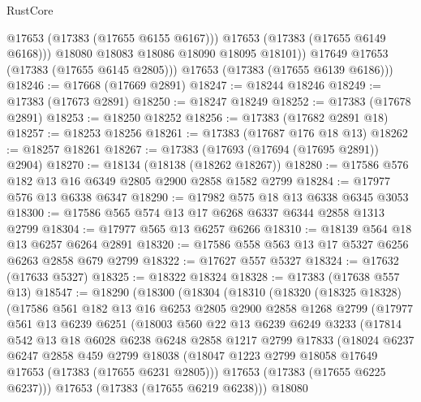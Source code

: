 \begin{lexlean}{RustCore}
\begin{coremodule}
                @17653
                (@17383 (@17655 @6155 @6167)))
              @17653
              (@17383 (@17655 @6149 @6168)))
            @18080
            @18083
            @18086
            @18090
            @18095
            @18101))
        @17649
        @17653
        (@17383 (@17655 @6145 @2805)))
      @17653
      (@17383 (@17655 @6139 @6186)))
@18246 := @17668 (@17669 @2891)
@18247 := @18244 @18246
@18249 := @17383 (@17673 @2891)
@18250 := @18247 @18249
@18252 := @17383 (@17678 @2891)
@18253 := @18250 @18252
@18256 := @17383 (@17682 @2891 @18)
@18257 := @18253 @18256
@18261 := @17383 (@17687 @176 @18 @13)
@18262 := @18257 @18261
@18267 := @17383 (@17693 (@17694 (@17695 @2891)) @2904)
@18270 := @18134 (@18138 (@18262 @18267))
@18280 := @17586 @576 @182 @13 @16 @6349 @2805 @2900 @2858 @1582 @2799
@18284 := @17977 @576 @13 @6338 @6347
@18290 := @17982 @575 @18 @13 @6338 @6345 @3053
@18300 := @17586 @565 @574 @13 @17 @6268 @6337 @6344 @2858 @1313 @2799
@18304 := @17977 @565 @13 @6257 @6266
@18310 := @18139 @564 @18 @13 @6257 @6264 @2891
@18320 := @17586 @558 @563 @13 @17 @5327 @6256 @6263 @2858 @679 @2799
@18322 := @17627 @557 @5327
@18324 := @17632 (@17633 @5327)
@18325 := @18322 @18324
@18328 := @17383 (@17638 @557 @13)
@18547 := @18290
    (@18300
      (@18304
        (@18310
          (@18320
            (@18325 @18328)
            (@17586
              @561
              @182
              @13
              @16
              @6253
              @2805
              @2900
              @2858
              @1268
              @2799
              (@17977
                @561
                @13
                @6239
                @6251
                (@18003
                  @560
                  @22
                  @13
                  @6239
                  @6249
                  @3233
                  (@17814
                    @542
                    @13
                    @18
                    @6028
                    @6238
                    @6248
                    @2858
                    @1217
                    @2799
                    @17833
                    (@18024
                      @6237
                      @6247
                      @2858
                      @459
                      @2799
                      @18038
                      (@18047 @1223 @2799 @18058 @17649 @17653 (@17383 (@17655 @6231 @2805)))
                      @17653
                      (@17383 (@17655 @6225 @6237)))
                    @17653
                    (@17383 (@17655 @6219 @6238)))
                  @18080

\end{coremodule}
\end{lexlean}
